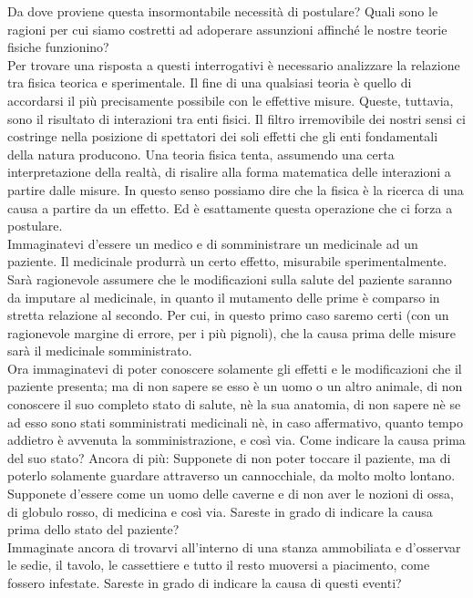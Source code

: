 \documentclass[]{article}
\begin{document}
	Da dove proviene questa insormontabile necessità di postulare? Quali sono le ragioni per cui siamo costretti ad adoperare assunzioni affinché le nostre teorie fisiche funzionino? \\
	Per trovare una risposta a questi interrogativi è necessario analizzare la relazione tra fisica teorica e sperimentale. Il fine di una qualsiasi teoria è quello di accordarsi il più precisamente possibile con le effettive misure. Queste, tuttavia, sono il risultato di interazioni tra enti fisici. Il filtro irremovibile dei nostri sensi ci costringe nella posizione di spettatori dei soli effetti che gli enti fondamentali della natura producono. Una teoria fisica tenta, assumendo una certa interpretazione della realtà, di risalire alla forma matematica delle interazioni a partire dalle misure. In questo senso possiamo dire che la fisica è la ricerca di una causa a partire da un effetto. Ed è esattamente questa operazione che ci forza a postulare.\\
	Immaginatevi d'essere un medico e di somministrare un medicinale ad un paziente. Il medicinale produrrà un certo effetto, misurabile sperimentalmente. Sarà ragionevole assumere che le modificazioni sulla salute del paziente saranno da imputare al medicinale, in quanto il mutamento delle prime è comparso in stretta relazione al secondo. Per cui, in questo primo caso saremo certi (con un ragionevole margine di errore, per i più pignoli), che la causa prima delle misure sarà il medicinale somministrato.\\
	Ora immaginatevi di poter conoscere solamente gli effetti e le modificazioni che il paziente presenta; ma di non sapere se esso è un uomo o un altro animale, di non conoscere il suo completo stato di salute, nè la sua anatomia, di non sapere nè se ad esso sono stati somministrati medicinali nè, in caso affermativo, quanto tempo addietro è avvenuta la somministrazione, e così via. Come indicare la causa prima del suo stato? Ancora di più: Supponete di non poter toccare il paziente, ma di poterlo solamente guardare attraverso un cannocchiale, da molto molto lontano. Supponete d'essere come un uomo delle caverne e di non aver le nozioni di ossa, di globulo rosso, di medicina e così via.
	Sareste in grado di indicare la causa prima dello stato del paziente?\\
	Immaginate ancora di trovarvi all'interno di una stanza ammobiliata e d'osservar le sedie, il tavolo, le cassettiere e tutto il resto muoversi a piacimento, come fossero infestate. Sareste in grado di indicare la causa di questi eventi? \\
\end{document}
